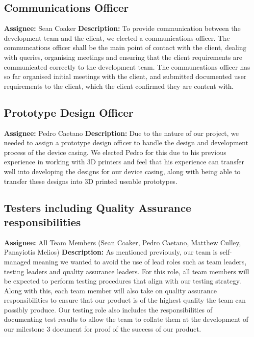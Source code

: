        \subsection{Communications Officer}
            \textbf{Assignee: } Sean Coaker\newline
            \textbf{Description: } To provide communication between the development team and the client, we elected a communications officer. The communcations officer shall be the main point of contact with the client, dealing with queries, organising meetings and ensuring that the client requirements are communicated correctly to the development team. The communcations officer has so far organised initial meetings with the client, and submitted documented user requirements to the client, which the client confirmed they are content with.

        \subsection{Prototype Design Officer}
            \textbf{Assignee: } Pedro Caetano\newline
            \textbf{Description: } Due to the nature of our project, we needed to assign a prototype design officer to handle the design and development process of the device casing. We elected Pedro for this due to his previous experience in working with 3D printers and feel that his experience can transfer well into developing the designs for our device casing, along with being able to transfer these designs into 3D printed useable prototypes.

        \subsection{Testers including Quality Assurance responsibilities}
            \textbf{Assignee: } All Team Members (Sean Coaker, Pedro Caetano, Matthew Culley, Panayiotis Melios)\newline
            \textbf{Description: } As mentioned previously, our team is self-managed meaning we wanted to avoid the use of lead roles such as team leaders, testing leaders and quality assurance leaders. For this role, all team members will be expected to perform testing procedures that align with our testing strategy. Along with this, each team member will also take on quality assurance responsibilities to ensure that our product is of the highest quality the team can possibly produce. Our testing role also includes the responsibilities of documenting test results to allow the team to collate them at the development of our milestone 3 document for proof of the success of our product.

